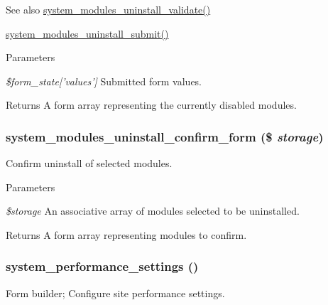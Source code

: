 \begin{DoxySeeAlso}{See also}
\hyperlink{system_8admin_8inc_a043bb0ba8fa3b299202ffee8d63e9fca}{system\_\-modules\_\-uninstall\_\-validate()} 

\hyperlink{system_8admin_8inc_aa4fa94b5401ff21e77b711edf0e196c4}{system\_\-modules\_\-uninstall\_\-submit()} 
\end{DoxySeeAlso}

\begin{DoxyParams}{Parameters}
\item[{\em \$form\_\-state\mbox{[}'values'\mbox{]}}]Submitted form values. \end{DoxyParams}
\begin{DoxyReturn}{Returns}
A form array representing the currently disabled modules. 
\end{DoxyReturn}
\hypertarget{group__forms_ga3006c568c437410b5fedb4c6d68ddbf4}{
\subsubsection[{system\_\-modules\_\-uninstall\_\-confirm\_\-form}]{\setlength{\rightskip}{0pt plus 5cm}system\_\-modules\_\-uninstall\_\-confirm\_\-form (\$ {\em storage})}}
\label{group__forms_ga3006c568c437410b5fedb4c6d68ddbf4}
Confirm uninstall of selected modules.


\begin{DoxyParams}{Parameters}
\item[{\em \$storage}]An associative array of modules selected to be uninstalled. \end{DoxyParams}
\begin{DoxyReturn}{Returns}
A form array representing modules to confirm. 
\end{DoxyReturn}
\hypertarget{group__forms_ga47b1f34bfff2f44fd22cfc866bff59d7}{
\subsubsection[{system\_\-performance\_\-settings}]{\setlength{\rightskip}{0pt plus 5cm}system\_\-performance\_\-settings ()}}
\label{group__forms_ga47b1f34bfff2f44fd22cfc866bff59d7}
Form builder; Configure site performance settings.

